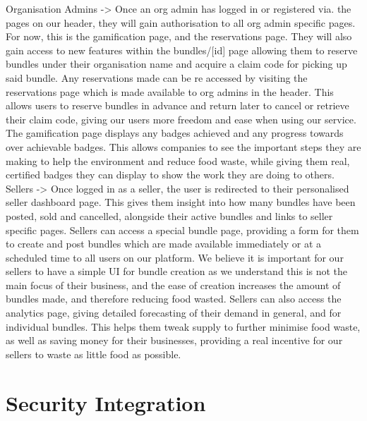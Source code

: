 \documentclass[11pt, a4paper]{report}
\begin{document}
	Organisation Admins -> Once an org admin has logged in or registered via. the pages on our header, they will gain authorisation to all org admin specific pages. For now, this is the gamification page, and the reservations page. They will also gain access to new features within the bundles/[id] page allowing them to reserve bundles under their organisation name and acquire a claim code for picking up said bundle.
	Any reservations made can be re accessed by visiting the reservations page which is made available to org admins in the header. This allows users to reserve bundles in advance and return later to cancel or retrieve their claim code, giving our users more freedom and ease when using our service. The gamification page displays any badges achieved and any progress towards over achievable badges. This allows companies to see the important steps they are making to help the environment and reduce food waste, while giving them real, certified badges they can display to show the work they are doing to others.\\
	
	Sellers -> Once logged in as a seller, the user is redirected to their personalised seller dashboard page. This gives them insight into how many bundles have been posted, sold and cancelled, alongside their active bundles and links to seller specific pages.	Sellers can access a special bundle page, providing a form for them to create and post bundles which are made available immediately or at a scheduled time to all users on our platform. We believe it is important for our sellers to have a simple UI for bundle creation as we understand this is not the main focus of their business, and the ease of creation increases the amount of bundles made, and therefore reducing food wasted. Sellers can also access the analytics page, giving detailed forecasting of their demand in general, and for individual bundles. This helps them tweak supply to further minimise food waste, as well as saving money for their businesses, providing a real incentive for our sellers to waste as little food as possible.
	
	\section{Security Integration}
	
\end{document}
